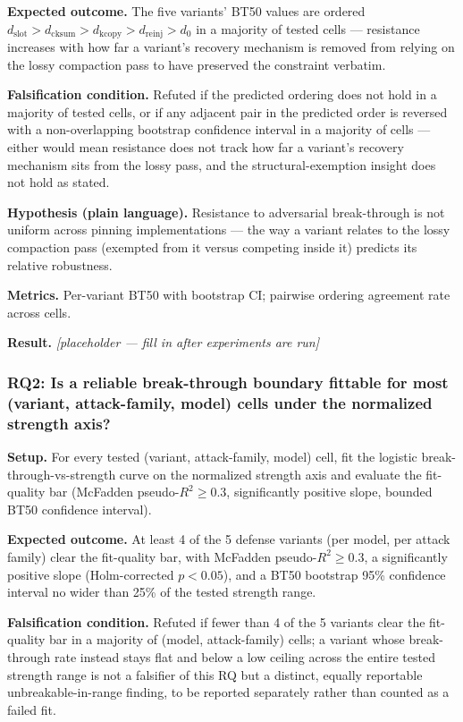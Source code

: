 \documentclass[11pt]{article}
\newcommand{\ph}{\textit{[placeholder --- fill in after experiments are run]}}
\begin{document}
\textbf{Expected outcome.} The five variants' BT50 values are ordered $d_{\text{slot}} > d_{\text{cksum}} > d_{\text{kcopy}} > d_{\text{reinj}} > d_0$ in a majority of tested cells --- resistance increases with how far a variant's recovery mechanism is removed from relying on the lossy compaction pass to have preserved the constraint verbatim.

\textbf{Falsification condition.} Refuted if the predicted ordering does not hold in a majority of tested cells, or if any adjacent pair in the predicted order is reversed with a non-overlapping bootstrap confidence interval in a majority of cells --- either would mean resistance does not track how far a variant's recovery mechanism sits from the lossy pass, and the structural-exemption insight does not hold as stated.

\textbf{Hypothesis (plain language).} Resistance to adversarial break-through is not uniform across pinning implementations --- the way a variant relates to the lossy compaction pass (exempted from it versus competing inside it) predicts its relative robustness.

\textbf{Metrics.} Per-variant BT50 with bootstrap CI; pairwise ordering agreement rate across cells.

\textbf{Result.} \ph

\subsubsection{RQ2: Is a reliable break-through boundary fittable for most (variant, attack-family, model) cells under the normalized strength axis?}
\textbf{Setup.} For every tested (variant, attack-family, model) cell, fit the logistic break-through-vs-strength curve on the normalized strength axis and evaluate the fit-quality bar (McFadden pseudo-$R^2 \geq 0.3$, significantly positive slope, bounded BT50 confidence interval).

\textbf{Expected outcome.} At least 4 of the 5 defense variants (per model, per attack family) clear the fit-quality bar, with McFadden pseudo-$R^2 \geq 0.3$, a significantly positive slope (Holm-corrected $p<0.05$), and a BT50 bootstrap 95\% confidence interval no wider than 25\% of the tested strength range.

\textbf{Falsification condition.} Refuted if fewer than 4 of the 5 variants clear the fit-quality bar in a majority of (model, attack-family) cells; a variant whose break-through rate instead stays flat and below a low ceiling across the entire tested strength range is not a falsifier of this RQ but a distinct, equally reportable unbreakable-in-range finding, to be reported separately rather than counted as a failed fit.
\end{document}
